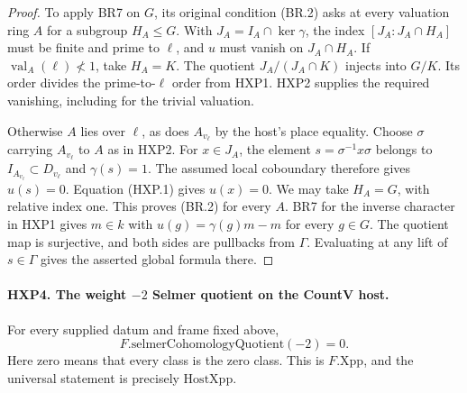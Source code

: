 \begin{proof}
To apply BR7 on $G$, its original condition (BR.2) asks at every
valuation ring $A$ for a subgroup $H_A\le G$. With
$J_A=I_A\cap\ker\gamma$, the index $[J_A:J_A\cap H_A]$ must be
finite and prime to $\ell$, and $u$ must vanish on $J_A\cap H_A$.
If $\operatorname{val}_A(\ell)\not<1$, take $H_A=K$. The quotient
$J_A/(J_A\cap K)$ injects into $G/K$. Its order divides the
prime-to-$\ell$ order from HXP1. HXP2 supplies the required
vanishing, including for the trivial valuation.

Otherwise $A$ lies over $\ell$, as does $A_{v_\ell}$ by the
host's place equality. Choose $\sigma$ carrying $A_{v_\ell}$ to
$A$ as in HXP2. For $x\in J_A$, the element
$s=\sigma^{-1}x\sigma$ belongs to $I_{A_{v_\ell}}\subset D_{v_\ell}$
and $\gamma(s)=1$. The assumed local coboundary therefore gives
$u(s)=0$. Equation (HXP.1) gives $u(x)=0$. We may take $H_A=G$,
with relative index one. This proves (BR.2) for every $A$.
BR7 for the inverse character in HXP1 gives $m\in k$ with
$u(g)=\gamma(g)m-m$ for every $g\in G$. The quotient map is
surjective, and both sides are pullbacks from $\Gamma$. Evaluating at
any lift of $s\in\Gamma$ gives the asserted global formula there.
\end{proof}

\paragraph{HXP4. The weight $-2$ Selmer quotient on the CountV host.}
\label{claim:HXP4}
For every supplied datum and frame fixed above,
\[
    F.\mathrm{selmerCohomologyQuotient}(-2)=0 .
\]
Here zero means that every class is the zero class. This is
$F.\mathrm{Xpp}$, and the universal statement is precisely
$\mathrm{HostXpp}$.

